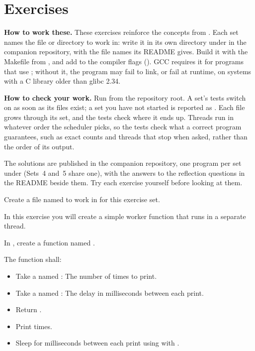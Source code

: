 
\section{Exercises}
\label{c6:sec:exercises}\label{c6:app:b}

\begin{aside}
\textbf{How to work these.} These exercises reinforce the concepts from .
Each set names the file or directory to work in: write it in its own directory under
 in the companion repository, with the file names its README gives.
Build it with the Makefile from , and add  to the compiler
flags (). GCC requires it for programs that
use ; without it, the program may fail to link, or fail at runtime, on systems
with a C library older than glibc 2.34.

\textbf{How to check your work.} Run  from the repository root. A set's tests
switch on as soon as its files exist; a set you have not started is reported as . Each
file grows through its set, and the tests check where it ends up. Threads run in whatever order the
scheduler picks, so the tests check what a correct program guarantees, such as exact counts and
threads that stop when asked, rather than the order of its output.

The solutions are published in the companion repository, one program per set under
 (Sets~4 and~5 share one), with the answers to the reflection
questions in the README beside them. Try each exercise yourself before looking at them.
\end{aside}

\label{c6:set:1}
Create a file named  to work in for this exercise set.

\label{c6:ex:1.1}
In this exercise you will create a simple worker function that runs in a separate thread.

In , create a function named .

The function shall:
\begin{itemize}
  \item Take a  named : The number of times to print.
  \item Take a  named : The delay in milliseconds between
    each print.
  \item Return .
  \item Print   times.
  \item Sleep for  milliseconds between each print using
     with .
\end{itemize}

